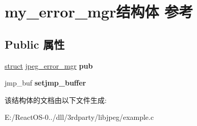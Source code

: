 \hypertarget{structmy__error__mgr}{}\section{my\+\_\+error\+\_\+mgr结构体 参考}
\label{structmy__error__mgr}
\subsection*{Public 属性}
\begin{DoxyCompactItemize}
\item 
\mbox{\label{structmy__error__mgr_aac1fb61cc51b4d8edbb44ba85fcccdb4}} 
\hyperlink{interfacestruct}{struct} \hyperlink{structjpeg__error__mgr}{jpeg\+\_\+error\+\_\+mgr} {\bfseries pub}
\item 
\mbox{\label{structmy__error__mgr_a751138dd0c774fe1d41bb5465b3a7539}} 
jmp\+\_\+buf {\bfseries setjmp\+\_\+buffer}
\end{DoxyCompactItemize}


该结构体的文档由以下文件生成\+:\begin{DoxyCompactItemize}
\item 
E\+:/\+React\+O\+S-\/0../dll/3rdparty/libjpeg/example.\+c\end{DoxyCompactItemize}
